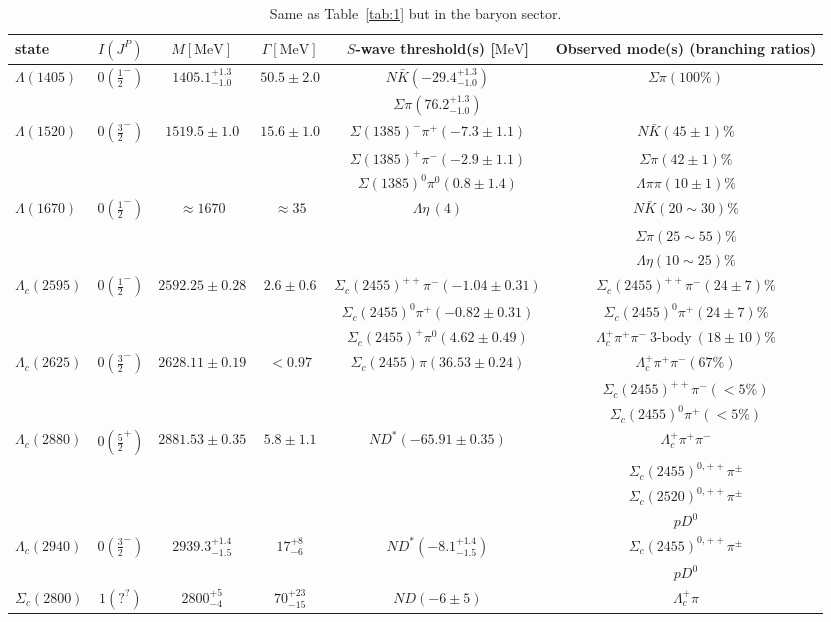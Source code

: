 \begin{table*}
\caption{Same as Table~\ref{tab:1} but in the  baryon
sector.}
\begin{ruledtabular}
 \begin{tabular}{l c c c c c}
state & $I(J^{P})$ & $M[\mathrm{MeV}]$ & $\Gamma[\mathrm{MeV}]$ & $S$-wave 
threshold(s) [$\mathrm{MeV}$] & Observed mode(s) (branching
ratios)\tabularnewline
\hline
$\Lambda(1405)$ & $0(\frac{1}{2}^{-})$ & $1405.1_{-1.0}^{+1.3}$ & $50.5\pm2.0$ & 
$N\bar{K}(-29.4_{-1.0}^{+1.3})$ &
$\Sigma\pi(100\%)$\tabularnewline
&&&&$\Sigma\pi(76.2^{+1.3}_{-1.0})$&\tabularnewline
\hline
$\Lambda(1520)$& $0(\frac 32^-)$ & $1519.5\pm 1.0$  & $15.6\pm 1.0$  
&$\Sigma(1385)^-\pi^+(-7.3\pm 1.1)$   & $N\bar{K} (45\pm 1)\%$
\tabularnewline
&&&&$\Sigma(1385)^+\pi^-(-2.9 \pm 1.1)$& $\Sigma\pi(42\pm 1)\%$\tabularnewline
&&&&$\Sigma(1385)^0\pi^0(0.8 \pm 1.4)$& $\Lambda\pi\pi(10\pm 
1)\%$\tabularnewline
\hline
$\Lambda(1670)$
& $0(\frac 12^-)$ &
$\approx1670$ & $\approx35$  &$\Lambda\eta\,(4)$   & $N\bar{K} (20\sim 30)\%$
\tabularnewline
&&&&& $\Sigma\pi(25\sim 55)\%$\tabularnewline
&&&&& $\Lambda\eta(10\sim 25)\%$\tabularnewline
\hline
$\Lambda_c(2595)$ & $0(\frac{1}{2}^{-})$ & $2592.25\pm 0.28$ & $2.6\pm0.6$ & 
$\Sigma_c(2455)^{++}\pi^- (-1.04\pm 0.31)$ &
$\Sigma_c(2455)^{++}\pi^-(24\pm 7)\%$\tabularnewline
 &  &  & & $\Sigma_c(2455)^0\pi^+ (-0.82\pm 0.31)$&
$\Sigma_c(2455)^{0}\pi^+(24\pm 7)\%$\tabularnewline
 &  &  & & $\Sigma_c(2455)^+\pi^0 (4.62 \pm 0.49)$&
$\Lambda_c^{+}\pi^+\pi^-~\text{3-body}~(18\pm 10)\%$\tabularnewline
\hline
$\Lambda_c(2625)$ & $0(\frac{3}{2}^{-})$ & $2628.11\pm 0.19$ & $<0.97$ & 
$\Sigma_c(2455)\pi (36.53\pm 0.24)$ &
$\Lambda_c^+\pi^+\pi^-(67\%)$\tabularnewline
 &  &  & & &
$\Sigma_c(2455)^{++}\pi^-(<5\%)$\tabularnewline
 &  &  & & &
$\Sigma_c(2455)^0\pi^+(<5\%)$\tabularnewline
\hline
$\Lambda_c(2880)$ & $0(\frac{5}{2}^{+})$ & $2881.53\pm 0.35$ & $5.8 \pm 1.1$ & 
$ND^*(-65.91\pm 0.35)$&
$\Lambda_c^+\pi^+\pi^-$\tabularnewline
 & &  & & &
$\Sigma_c(2455)^{0,++}\pi^\pm $\tabularnewline
 & &  & & &
$\Sigma_c(2520)^{0,++}\pi^\pm $\tabularnewline
 & &  & & &
$pD^0 $\tabularnewline
\hline
$\Lambda_c(2940)$ & $0(\frac 32^-)$ &
$2939.3_{-1.5}^{+1.4}$ & $17^{+8}_{-6}$ & 
$ND^*(-8.1_{-1.5}^{+1.4})$ &
$\Sigma_c(2455)^{0,++}\pi^\pm$\tabularnewline
 & \cite{Aaij:2017vbw} &  &  &  &
$pD^0$\tabularnewline
\hline
$\Sigma_c(2800)$ & $1(?^?)$ & $2800_{-4}^{+5}$ & $70^{+23}_{-15}$ & $ND(-6 \pm 
5)$ &
$\Lambda_c^+\pi$\tabularnewline

\end{tabular}
\end{ruledtabular}
\end{table*}
